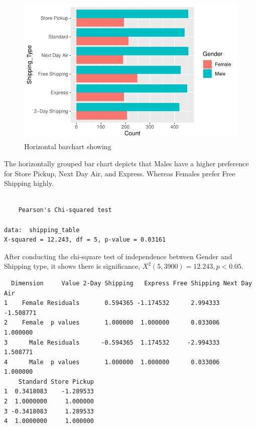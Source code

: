\documentclass[
  letterpaper,
  DIV=11,
  numbers=noendperiod]{scrartcl}
\begin{document}
\begin{figure}[H]

{\centering \includegraphics{Customer_Preference_Analytics_files/figure-pdf/unnamed-chunk-34-1.pdf}

}

\caption{Horizontal barchart showing}

\end{figure}%

The horizontally grouped bar chart depicts that Males have a higher
preference for Store Pickup, Next Day Air, and Express. Whereas Females
prefer Free Shipping highly.

\begin{verbatim}

    Pearson's Chi-squared test

data:  shipping_table
X-squared = 12.243, df = 5, p-value = 0.03161
\end{verbatim}

After conducting the chi-square test of independence between Gender and
Shipping type, it shows there is significance,
\(X^{2}(5,3900) = 12.243, p < 0.05\).

\begin{verbatim}
  Dimension     Value 2-Day Shipping   Express Free Shipping Next Day Air
1    Female Residuals       0.594365 -1.174532      2.994333    -1.508771
2    Female  p values       1.000000  1.000000      0.033006     1.000000
3      Male Residuals      -0.594365  1.174532     -2.994333     1.508771
4      Male  p values       1.000000  1.000000      0.033006     1.000000
    Standard Store Pickup
1  0.3418083    -1.289533
2  1.0000000     1.000000
3 -0.3418083     1.289533
4  1.0000000     1.000000
\end{verbatim}
\end{document}
